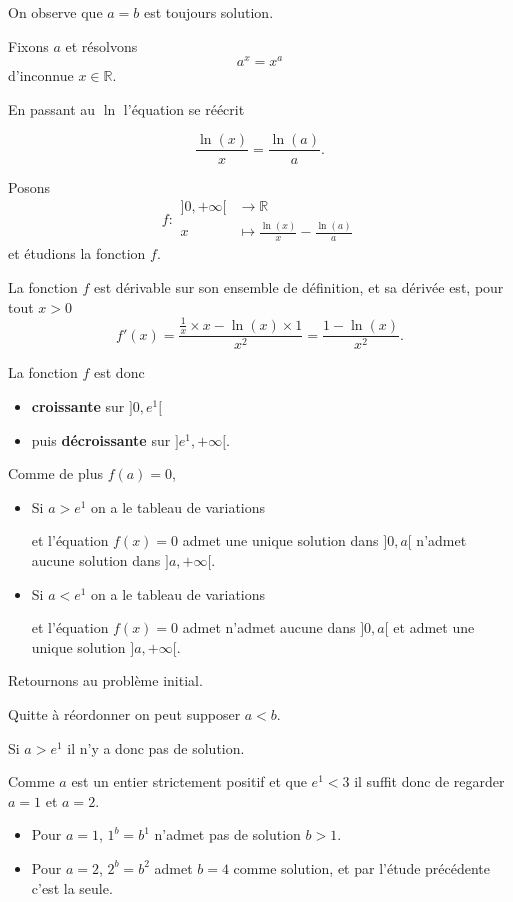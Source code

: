 \begin{sol}
  On observe que $a=b$ est toujours solution.



  Fixons $a$ et résolvons
  \[a^x = x^a\]
  d'inconnue $x \in \mathbb{R}$.

  En passant au $\ln$ l'équation se réécrit

  \[\frac{\ln(x)}{x} = \frac{\ln(a)}{a}.\]

  Posons
  \[f : \begin{aligned}
      ]0,+\infty[ & \to \mathbb{R}                              \\
      x           & \mapsto \frac{\ln(x)}{x} - \frac{\ln(a)}{a}
    \end{aligned}\]
  et étudions la fonction $f$.

  La fonction $f$ est dérivable sur son ensemble de définition, et sa dérivée est, pour tout $x > 0$
  \[f'(x) = \frac{\frac{1}{x} \times x - \ln(x) \times 1}{x^2} = \frac{1-\ln(x)}{x^2}.\]

  La fonction $f$ est donc
  \begin{itemize}
    \item \textbf{croissante} sur $]0,e^1[$
    \item puis \textbf{décroissante} sur $]e^1,+\infty[$.
  \end{itemize}

  Comme de plus $f(a)=0$,

  \begin{itemize}
    \item Si $a > e^1$ on a le tableau de variations


          et l'équation $f(x) = 0$ admet une unique solution dans $]0,a[$ n'admet aucune solution dans $]a,+\infty[$.
    \item Si $a < e^1$ on a le tableau de variations


          et l'équation $f(x) = 0$ admet n'admet aucune dans $]0,a[$ et admet une unique solution $]a,+\infty[$.
  \end{itemize}

  Retournons au problème initial.

  Quitte à réordonner on peut supposer $a < b$.

  Si $a>e^1$ il n'y a donc pas de solution.

  Comme $a$ est un entier strictement positif et que $e^1 < 3$ il suffit donc de regarder $a=1$ et $a=2$.

  \begin{itemize}
    \item Pour $a=1$, $1^b = b^1$ n'admet pas de solution $b > 1$.
    \item Pour $a=2$, $2^b = b^2$ admet $b=4$ comme solution, et par l'étude précédente c'est la seule.
  \end{itemize}


\end{sol}
